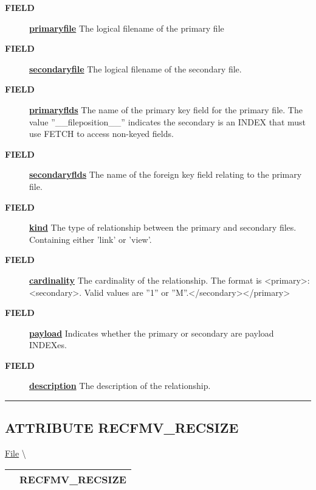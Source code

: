 \par
\begin{description}
\item [\colorbox{tagtype}{\color{white} \textbf{\textsf{FIELD}}}] \textbf{\underline{primaryfile}} The logical filename of the primary file
\item [\colorbox{tagtype}{\color{white} \textbf{\textsf{FIELD}}}] \textbf{\underline{secondaryfile}} The logical filename of the secondary file.
\item [\colorbox{tagtype}{\color{white} \textbf{\textsf{FIELD}}}] \textbf{\underline{primaryflds}} The name of the primary key field for the primary file. The value ''\_\_fileposition\_\_'' indicates the secondary is an INDEX that must use FETCH to access non-keyed fields.
\item [\colorbox{tagtype}{\color{white} \textbf{\textsf{FIELD}}}] \textbf{\underline{secondaryflds}} The name of the foreign key field relating to the primary file.
\item [\colorbox{tagtype}{\color{white} \textbf{\textsf{FIELD}}}] \textbf{\underline{kind}} The type of relationship between the primary and secondary files. Containing either 'link' or 'view'.
\item [\colorbox{tagtype}{\color{white} \textbf{\textsf{FIELD}}}] \textbf{\underline{cardinality}} The cardinality of the relationship. The format is <primary>:<secondary>. Valid values are ''1'' or ''M''.</secondary></primary>
\item [\colorbox{tagtype}{\color{white} \textbf{\textsf{FIELD}}}] \textbf{\underline{payload}} Indicates whether the primary or secondary are payload INDEXes.
\item [\colorbox{tagtype}{\color{white} \textbf{\textsf{FIELD}}}] \textbf{\underline{description}} The description of the relationship.
\end{description}

\rule{\linewidth}{0.5pt}
\subsection*{\textsf{\colorbox{headtoc}{\color{white} ATTRIBUTE}
RECFMV\_RECSIZE}}

\hypertarget{ecldoc:file.recfmv_recsize}{}
\hspace{0pt} \hyperlink{ecldoc:File}{File} \textbackslash 

{\renewcommand{\arraystretch}{1.5}
\begin{tabularx}{\textwidth}{|>{\raggedright\arraybackslash}l|X|}
\hline
\hspace{0pt}\mytexttt{\color{red} } & \textbf{RECFMV\_RECSIZE} \\
\hline
\end{tabularx}
}

